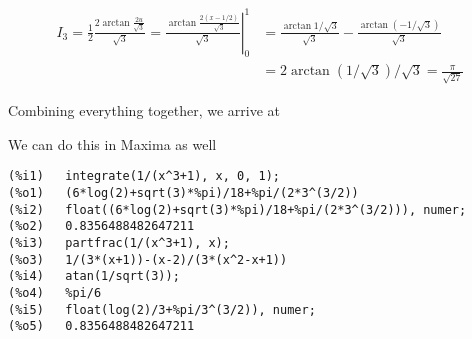 \begin{align*}
I_3 = \frac{1}{2} \frac{2 \arctan \frac{2u}{\sqrt{3}}}{\sqrt{3}} = \left. \frac{ \arctan \frac{2(x-1/2)}{\sqrt{3}}}{\sqrt{3}} \right|_0^1 & = \frac{\arctan 1/\sqrt{3}}{\sqrt{3}} - \frac{\arctan \left(-1/\sqrt{3}\right) }{\sqrt{3}} \\ & = 2 \arctan \left(1/\sqrt{3}\right)/\sqrt{3} = \frac{\pi}{\sqrt{27}}
\end{align*}

Combining everything together, we arrive at

\bee
{}
\eee

We can do this in Maxima as well

\begin{verbatim}
(%i1)	integrate(1/(x^3+1), x, 0, 1);
(%o1)	(6*log(2)+sqrt(3)*%pi)/18+%pi/(2*3^(3/2))
(%i2)	float((6*log(2)+sqrt(3)*%pi)/18+%pi/(2*3^(3/2))), numer;
(%o2)	0.8356488482647211
(%i3)	partfrac(1/(x^3+1), x);
(%o3)	1/(3*(x+1))-(x-2)/(3*(x^2-x+1))
(%i4)	atan(1/sqrt(3));
(%o4)	%pi/6
(%i5)	float(log(2)/3+%pi/3^(3/2)), numer;
(%o5)	0.8356488482647211
\end{verbatim}